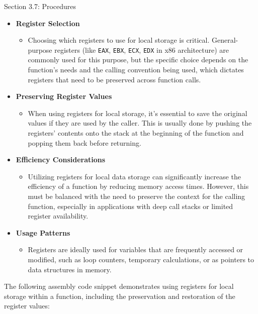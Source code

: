 \begin{notes}{Section 3.7: Procedures}
    \begin{itemize}
        \item \textbf{Register Selection}
        \begin{itemize}
            \item Choosing which registers to use for local storage is critical. General-purpose registers (like \texttt{EAX}, \texttt{EBX}, \texttt{ECX}, \texttt{EDX} in x86 architecture) are commonly 
            used for this purpose, but the specific choice depends on the function's needs and the calling convention being used, which dictates registers that need to be preserved across function calls.
        \end{itemize}
        \item \textbf{Preserving Register Values}
        \begin{itemize}
            \item When using registers for local storage, it's essential to save the original values if they are used by the caller. This is usually done by pushing the registers' contents onto the 
            stack at the beginning of the function and popping them back before returning.
        \end{itemize}
        \item \textbf{Efficiency Considerations}
        \begin{itemize}
            \item Utilizing registers for local data storage can significantly increase the efficiency of a function by reducing memory access times. However, this must be balanced with the need to 
            preserve the context for the calling function, especially in applications with deep call stacks or limited register availability.
        \end{itemize}
        \item \textbf{Usage Patterns}
        \begin{itemize}
            \item Registers are ideally used for variables that are frequently accessed or modified, such as loop counters, temporary calculations, or as pointers to data structures in memory.
        \end{itemize}
    \end{itemize}
    
    \begin{highlight}
        The following assembly code snippet demonstrates using registers for local storage within a function, including the preservation and restoration of the register values:
    

\end{highlight}
\end{notes}
